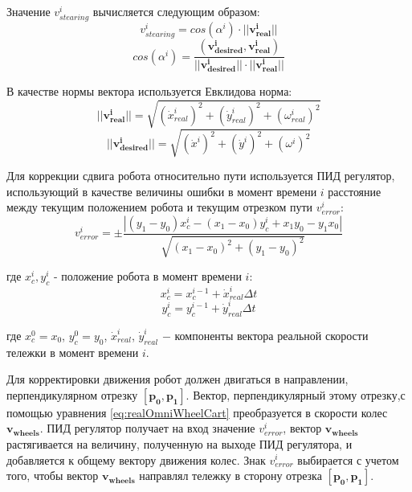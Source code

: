\documentclass[oneside,final,14pt]{extreport}
\newcommand{\bs}{\boldsymbol}
\begin{document}
  Значение $v_{stearing}^i$ вычисляется следующим образом:  
\begin{equation}
v_{stearing}^i
=
cos(\alpha^i)
\cdot
||\bs{v_{real}^i}||
\end{equation}
\begin{equation}
cos(\alpha^i)
=
\frac{
(\bs{v_{desired}^i},\bs{v_{real}^i})
}
{
||\bs{v_{desired}^i}||
\cdot
||\bs{v_{real}^i}||
}
\end{equation}

В качестве нормы вектора используется Евклидова норма:
\begin{equation}
||\bs{v_{real}^i}||
=
\sqrt{ 
	(\dot{x}_{real}^i)^2 
	+ 
	(\dot{y}_{real}^i)^2
	+
	(\omega_{real}^i)^2
	}	
\end{equation}
\begin{equation}
||\bs{v_{desired}^i}||
=
\sqrt{ 
	(\dot{x}^i)^2 
	+ 
	(\dot{y}^i)^2
	+
	(\omega^i)^2
	}	
\end{equation}

Для коррекции сдвига  робота относительно пути используется ПИД регулятор, использующий в качестве величины ошибки в момент времени $i$ расстояние между текущим положением робота и текущим отрезком пути  $v_{error}^i$:
\begin{equation}
v_{error}^i
=
\pm
\frac{
|
(y_1 - y_0)x_c^i
-
(x_1 - x_0)y_c^i
+
x_1 y_0
-
y_1 x_0
|
}
{
\sqrt{
(x_1 - x_0)^2
+
(y_1 - y_0)^2
}
}
\end{equation}

где $x_c^i, y_c^i$ - положение робота в момент времени $i$:
\begin{equation}
x_c^i =
x_c^{i-1}
+
\dot{x}_{real}^{i}
\Delta t 
\end{equation} 
\begin{equation}
y_c^i =
y_c^{i-1}
+
\dot{y}_{real}^{i}
\Delta t 
\end{equation} 

где $x_c^0 = x_0$, $y_c^0 = y_0$, $\dot{x}_{real}^{i}$, $\dot{y}_{real}^{i}$  $-$ компоненты вектора реальной скорости тележки в момент времени $i$. 

Для корректировки движения робот должен двигаться в направлении, перпендикулярном отрезку $[\bs{p_0},\bs{p_1}]$. Вектор, перпендикулярный этому отрезку,с помощью уравнения \ref{eq:realOmniWheelCart} преобразуется в скорости колес $\bs{v_{wheels}}$. ПИД регулятор получает на вход значение $v_{error}^i$, вектор $\bs{v_{wheels}}$ растягивается на величину, полученную на выходе ПИД регулятора, и добавляется к общему вектору движения колес. Знак $v_{error}^i$ выбирается с учетом того, чтобы вектор $\bs{v_{wheels}}$ направлял тележку в сторону отрезка $[\bs{p_0},\bs{p_1}]$.
\end{document}
